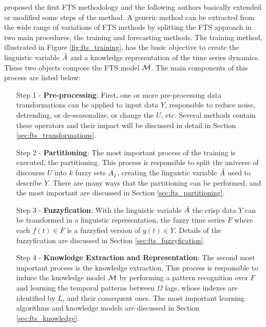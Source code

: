 \cite{Song1993partI} proposed the first FTS methodology and the following authors basically extended or modified some steps of the method. A generic method can be extracted from the wide range of variations of FTS methods by splitting the FTS approach in two main procedures, the training and forecasting methods. The training method, illustrated in Figure \ref{fig:fts_training}, has the basic objective to create the linguistic variable $\tilde{A}$ and a knowledge representation of the time series dynamics. These two objects compose the FTS model $\mathcal{M}$. The main components of this process are listed below:

\begin{enumerate}
    \item[Step 1] - \textbf{Pre-processing}: First, one or more pre-processing data transformations can be applied to input data $Y$, responsible to reduce noise, detrending, or de-seasonalize, or change the $U$, etc. Several methods contain these operators and their impact will be discussed in detail in Section \ref{sec:fts_transformations}.
    
    \item[Step 2] - \textbf{Partitioning}: The most important process of the training is executed, the partitioning. This process is responsible to split the universe of discourse $U$ into $k$ fuzzy sets $A_j$, creating the linguistic variable $\tilde{A}$ used to describe $Y$. There are many ways that the partitioning can be performed, and the most important are discussed in Section \ref{sec:fts_partitioning}.
    
    \item[Step 3] - \textbf{Fuzzyfication}: With the linguistic variable $\tilde{A}$ the crisp data $Y$ can be transformed in a linguistic representation, the fuzzy time series $F$ where each $f(t) \in F$ is a fuzzyfied version of $y(t) \in Y$. Details of the fuzzyfication are discussed in Section \ref{sec:fts_fuzzyfication}.
    
    \item[Step 4] - \textbf{Knowledge Extraction and Representation}: The second most important process is the knowledge extraction. This process is responsible to induce the knowledge model $\mathcal{M}$ by performing a pattern recognition over $F$ and learning the temporal patterns between  $\Omega$ lags, whose indexes are identified by $L$, and their consequent ones. The most important learning algorithms and knowledge models are discussed in Section \ref{sec:fts_knowledge}.
\end{enumerate}

